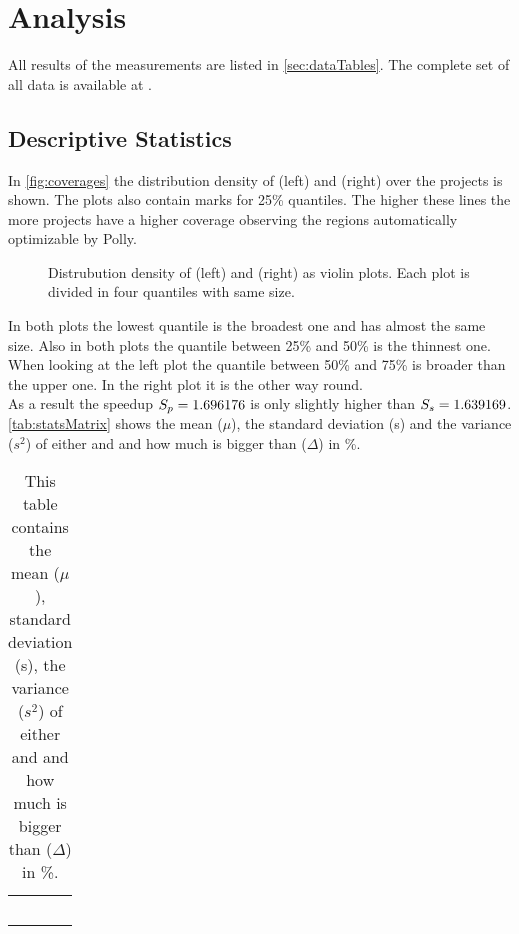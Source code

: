 \chapter{Analysis}
All results of the measurements are listed in \autoref{sec:dataTables}.
The complete set of all data is available at .

\section{Descriptive Statistics}
In \autoref{fig:coverages} the distribution density of \dyncovs (left) and \dyncovp (right) over the projects is shown.
The plots also contain marks for 25\% quantiles.
The higher these lines the more projects have a higher coverage observing the regions automatically optimizable by Polly.
\begin{figure}[!h]
    \caption[Distribution density of \dyncovs and \dyncovp]{
        Distrubution density of \dyncovs (left) and \dyncovp (right) as violin plots.
        Each plot is divided in four quantiles with same size.
    }
    
    \label{fig:coverages}
\end{figure}
In both plots the lowest quantile is the broadest one and has almost the same size.
Also in both plots the quantile between 25\% and 50\% is the thinnest one.
When looking at the left plot the quantile between 50\% and 75\% is broader than the upper one.
In the right plot it is the other way round.\\
As a result the speedup \(S_p=1.696176\) is only slightly higher than \(S_s=1.639169\).\\
\autoref{tab:statsMatrix} shows the mean (\(\mu\)), the standard deviation (s) and the variance (\(s^2\)) of either \dyncovp and \dyncovs and how much \dyncovp is bigger than \dyncovs (\(\Delta\)) in \%.
\begin{table}[!h]
    \myfloatalign
    \begin{tabularx}{\textwidth}{lCCC}
        \tableheadline{} &  & \tableheadline{\(\Delta\)} & \\\toprule
        \\\bottomrule
    \end{tabularx}
    \caption[Statistical evaluations of \dyncovp and \dyncovs]{
        This table contains the mean (\(\mu\)), standard deviation (s), the variance (\(s^2\)) of either \dyncovp and \dyncovs and how much \dyncovp is bigger than \dyncovs (\(\Delta\)) in \%.
    }
    \label{tab:statsMatrix}
\end{table}
